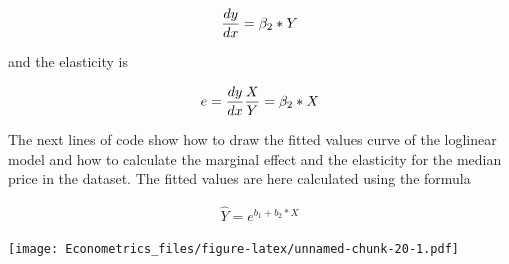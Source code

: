 \documentclass[
]{book}
\newenvironment{Shaded}{\begin{snugshade}}{\end{snugshade}}
\newcommand{\AttributeTok}[1]{\textcolor[rgb]{0.13,0.29,0.53}{#1}}
\newcommand{\CommentTok}[1]{\textcolor[rgb]{0.56,0.35,0.01}{\textit{#1}}}
\newcommand{\DecValTok}[1]{\textcolor[rgb]{0.00,0.00,0.81}{#1}}
\newcommand{\FunctionTok}[1]{\textcolor[rgb]{0.13,0.29,0.53}{\textbf{#1}}}
\newcommand{\NormalTok}[1]{#1}
\newcommand{\OtherTok}[1]{\textcolor[rgb]{0.56,0.35,0.01}{#1}}
\newcommand{\SpecialCharTok}[1]{\textcolor[rgb]{0.81,0.36,0.00}{\textbf{#1}}}
\newcommand{\StringTok}[1]{\textcolor[rgb]{0.31,0.60,0.02}{#1}}
\begin{document}
\[
\begin{aligned}
{dy\over dx}=\beta_2 * Y
\end{aligned}
\]

and the elasticity is

\[
\begin{aligned}
e= {dy\over dx} {X\over Y}=\beta_2 * X
\end{aligned}
\]

The next lines of code show how to draw the fitted values curve of the loglinear model and how to calculate the marginal effect and the elasticity for the median price in the dataset. The fitted values are here calculated using the formula

\[
\begin{aligned}
\hat{Y}= e^{b_1+b_2*X}
\end{aligned}
\]

\begin{Shaded}
\end{Shaded}

\texttt{[image: Econometrics\_files/figure-latex/unnamed-chunk-20-1.pdf]}

\begin{Shaded}
\end{Shaded}
\end{document}
